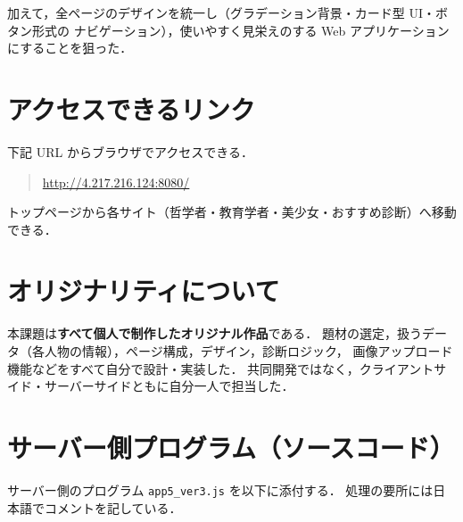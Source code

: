 \documentclass[11pt,a4paper]{ltjsarticle}
\newcommand{\siteURL}{http://4.217.216.124:8080/}
\begin{document}
加えて，全ページのデザインを統一し（グラデーション背景・カード型 UI・ボタン形式の
ナビゲーション），使いやすく見栄えのする Web アプリケーションにすることを狙った．

\section{アクセスできるリンク}

下記 URL からブラウザでアクセスできる．

\begin{quote}
  \large \url{\siteURL}
\end{quote}

トップページから各サイト（哲学者・教育学者・美少女・おすすめ診断）へ移動できる．

\section{オリジナリティについて}

本課題は\textbf{すべて個人で制作したオリジナル作品}である．
題材の選定，扱うデータ（各人物の情報），ページ構成，デザイン，診断ロジック，
画像アップロード機能などをすべて自分で設計・実装した．
共同開発ではなく，クライアントサイド・サーバーサイドともに自分一人で担当した．

\section{サーバー側プログラム（ソースコード）}

サーバー側のプログラム \texttt{app5\_ver3.js} を以下に添付する．
処理の要所には日本語でコメントを記している．


\end{document}
